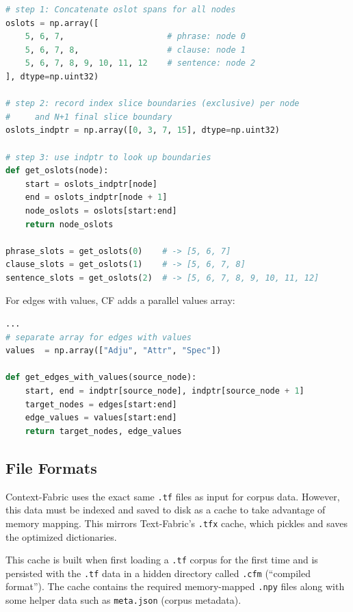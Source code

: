 \documentclass[11pt,a4paper]{article}
\begin{document}
\begin{lstlisting}[language=Python, caption=CSR format for oslots]
# step 1: Concatenate oslot spans for all nodes
oslots = np.array([
    5, 6, 7,                     # phrase: node 0
    5, 6, 7, 8,                  # clause: node 1
    5, 6, 7, 8, 9, 10, 11, 12    # sentence: node 2
], dtype=np.uint32)

# step 2: record index slice boundaries (exclusive) per node
#     and N+1 final slice boundary
oslots_indptr = np.array([0, 3, 7, 15], dtype=np.uint32)

# step 3: use indptr to look up boundaries
def get_oslots(node):
    start = oslots_indptr[node]
    end = oslots_indptr[node + 1]
    node_oslots = oslots[start:end]
    return node_oslots

phrase_slots = get_oslots(0)    # -> [5, 6, 7]
clause_slots = get_oslots(1)    # -> [5, 6, 7, 8]
sentence_slots = get_oslots(2)  # -> [5, 6, 7, 8, 9, 10, 11, 12]
\end{lstlisting}

For edges with values, CF adds a parallel values array:

\begin{lstlisting}[language=Python, caption=CSR with values]
...
# separate array for edges with values
values  = np.array(["Adju", "Attr", "Spec"])

def get_edges_with_values(source_node):
    start, end = indptr[source_node], indptr[source_node + 1]
    target_nodes = edges[start:end]
    edge_values = values[start:end]
    return target_nodes, edge_values
\end{lstlisting}

\subsection{File Formats}

Context-Fabric uses the exact same \texttt{.tf} files as input for corpus data.
However, this data must be indexed and saved to disk as a cache to take advantage of memory
mapping. This mirrors Text-Fabric's \texttt{.tfx} cache, which pickles and saves the
optimized dictionaries.

This cache is built when first loading a \texttt{.tf} corpus for the first time and is persisted
with the \texttt{.tf} data in a hidden directory called \texttt{.cfm} (``compiled format'').
The cache contains the required memory-mapped \texttt{.npy} files along with some helper
data such as \texttt{meta.json} (corpus metadata).
\end{document}
